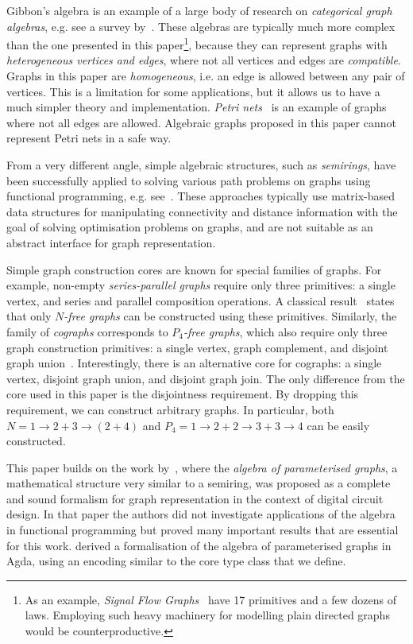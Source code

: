Gibbon's algebra is an example of a large body of research on \emph{categorical
graph algebras}, e.g. see a survey by~\citet{2010_selinger_survey}. These algebras
are typically much more complex than the one presented in this paper\footnote{As an
example, \emph{Signal Flow Graphs}~\cite{2015_bonchi_sfg} have 17 primitives
and a few dozens of laws. Employing such heavy machinery for modelling plain directed
graphs would be counterproductive.},
because they can represent graphs with
\emph{heterogeneous vertices and edges}, where not all vertices
and edges are \emph{compatible}. Graphs in this paper are \emph{homogeneous}, i.e.
an edge is allowed between any pair of vertices. This is a limitation for some
applications, but it allows us to have a much simpler theory and implementation.
\emph{Petri nets}~\cite{1989_murata_pn} is an example of graphs where not all
edges are allowed. Algebraic graphs proposed in this paper cannot represent Petri
nets in a safe way.

From a very different angle, simple algebraic structures, such as \emph{semirings},
have been successfully applied to solving various path problems on graphs using
functional programming, e.g. see~\citet{2013_semirings_dolan}. These approaches
typically use matrix-based data structures for manipulating connectivity and distance
information with the goal of solving optimisation problems on graphs, and are not
suitable as an abstract interface for graph representation.

Simple graph construction cores are known for special families of graphs. For example,
non-empty \emph{series-parallel graphs} require only three primitives: a single vertex,
and series and parallel composition operations. A classical result~\cite{1979_valdes_sp}
states that only \emph{$N$-free graphs} can be constructed using these primitives.
Similarly, the family of \emph{cographs} corresponds to \emph{$P_4$-free graphs}, which
also require only three graph construction primitives: a single vertex, graph complement,
and disjoint graph union~\cite{1981_corneil_cographs}. Interestingly, there is an
alternative core for cographs: a single vertex, disjoint graph union, and disjoint graph
join. The only difference from the core used in this paper is the disjointness requirement.
By dropping this requirement, we can construct arbitrary graphs. In particular, both
$N = 1 \rightarrow 2 + 3 \rightarrow (2 + 4)$ and
$P_4 = 1 \rightarrow 2 + 2 \rightarrow 3 + 3 \rightarrow 4$ can be easily constructed.

This paper builds on the work by~\citet{2014_algebra_mokhov}, where
the \emph{algebra of parameterised graphs}, a mathematical
structure very similar to a semiring, was proposed as a complete and sound formalism
for graph representation in the context of digital circuit design. In that paper the
authors did not investigate applications of the algebra in functional programming but
proved many important results that are essential for this work.
\citet{2014_alekseyev_phd} derived a formalisation of the algebra of parameterised
graphs in Agda, using an encoding similar to the core type class that we define.

